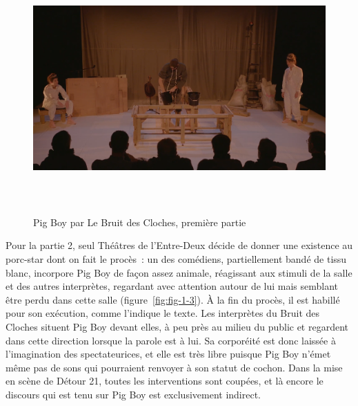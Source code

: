 \documentclass[
]{article}
\begin{document}
\begin{figure}
\centering
\includegraphics[width=17cm,height=9.532cm]{../assets/Pictures/100002010000061500000369BC796E070B503D8D.png}
\caption{Pig Boy par Le Bruit des Cloches, première partie}\label{fig:fig-1-2}
\end{figure}

Pour la partie 2, seul Théâtres de l'Entre-Deux décide de donner une existence au porc-star dont on fait le procès~: un des comédiens, partiellement bandé de tissu blanc, incorpore Pig Boy de façon assez animale, réagissant aux stimuli de la salle et des autres interprètes, regardant avec attention autour de lui mais semblant être perdu dans cette salle (figure~\ref{fig:fig-1-3}). À la fin du procès, il est habillé pour son exécution, comme l'indique le texte. Les interprètes du Bruit des Cloches situent Pig Boy devant elles, à peu près au milieu du public et regardent dans cette direction lorsque la parole est à lui. Sa corporéité est donc laissée à l'imagination des spectateurices, et elle est très libre puisque Pig Boy n'émet même pas de sons qui pourraient renvoyer à son statut de cochon. Dans la mise en scène de Détour 21, toutes les interventions sont coupées, et là encore le discours qui est tenu sur Pig Boy est exclusivement indirect.
\end{document}
